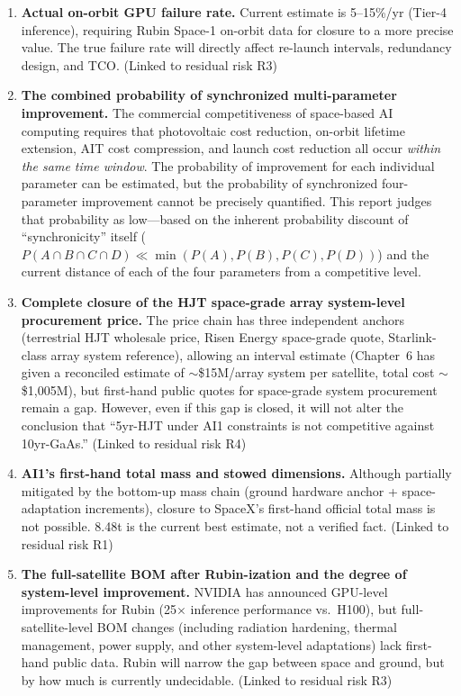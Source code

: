 \begin{enumerate}[leftmargin=*]
    \item \textbf{Actual on-orbit GPU failure rate.} Current estimate is 5--15\%/yr (Tier-4 inference), requiring Rubin Space-1 on-orbit data for closure to a more precise value. The true failure rate will directly affect re-launch intervals, redundancy design, and TCO. (Linked to residual risk R3)

    \item \textbf{The combined probability of synchronized multi-parameter improvement.} The commercial competitiveness of space-based AI computing requires that photovoltaic cost reduction, on-orbit lifetime extension, AIT cost compression, and launch cost reduction all occur \emph{within the same time window}. The probability of improvement for each individual parameter can be estimated, but the probability of synchronized four-parameter improvement cannot be precisely quantified. This report judges that probability as low---based on the inherent probability discount of ``synchronicity'' itself ($P(A \cap B \cap C \cap D) \ll \min(P(A), P(B), P(C), P(D))$) and the current distance of each of the four parameters from a competitive level.

    \item \textbf{Complete closure of the HJT space-grade array system-level procurement price.} The price chain has three independent anchors (terrestrial HJT wholesale price, Risen Energy space-grade quote, Starlink-class array system reference), allowing an interval estimate (Chapter~6 has given a reconciled estimate of $\sim$\$15M/array system per satellite, total cost $\sim$\$1,005M), but first-hand public quotes for space-grade system procurement remain a gap. However, even if this gap is closed, it will not alter the conclusion that ``5yr-HJT under AI1 constraints is not competitive against 10yr-GaAs.'' (Linked to residual risk R4)

    \item \textbf{AI1's first-hand total mass and stowed dimensions.} Although partially mitigated by the bottom-up mass chain (ground hardware anchor + space-adaptation increments), closure to SpaceX's first-hand official total mass is not possible. 8.48\;t is the current best estimate, not a verified fact. (Linked to residual risk R1)

    \item \textbf{The full-satellite BOM after Rubin-ization and the degree of system-level improvement.} NVIDIA has announced GPU-level improvements for Rubin (25$\times$ inference performance vs.\ H100), but full-satellite-level BOM changes (including radiation hardening, thermal management, power supply, and other system-level adaptations) lack first-hand public data. Rubin will narrow the gap between space and ground, but by how much is currently undecidable. (Linked to residual risk R3)
\end{enumerate}

